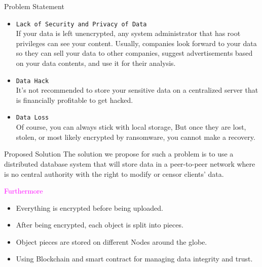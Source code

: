 \documentclass[aspectratio=169,usenames,dvipsnames,pdftex]{beamer}
\begin{document}
  \begin{frame}[t]{Problem Statement}%
    \begin{itemize}
    \item \texttt{Lack of Security and Privacy of Data} \\
      If your data is left unencrypted, any system administrator that has root privileges can see your content.
      Usually, companies look forward to your data so they can sell your data to other companies, suggest advertisements based on your data contents, and use it for their analysis.
    \item \texttt{Data Hack} \\
      It's not recommended to store your sensitive data on a centralized server that is financially profitable to get hacked.
    \item \texttt{Data Loss} \\
      Of course, you can always stick with local storage, But once they are lost, stolen, or most likely encrypted by ransomware, you cannot make a recovery.
    \end{itemize}
  \end{frame}

  \begin{frame}{Proposed Solution}
    The solution we propose for such a problem is to use a distributed database system that will store data in a peer-to-peer network where is no central authority with the right to modify or censor clients' data. \\\vspace{8pt}

    \textcolor{magenta}{Furthermore} \\
    \begin{itemize}
    \item Everything is encrypted before being uploaded. \\
    \item After being encrypted, each object is split into pieces. \\
    \item Object pieces are stored on different Nodes around the globe. \\
    \item Using Blockchain and smart contract for managing data integrity and trust. \\
    \end{itemize}
  \end{frame}
\end{document}
